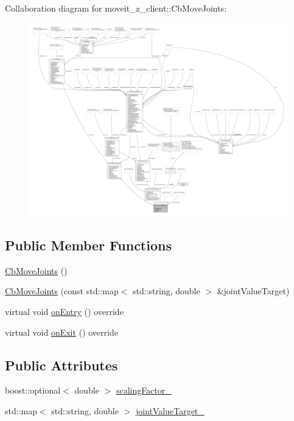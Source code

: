 Collaboration diagram for moveit\+\_\+z\+\_\+client\+:\+:Cb\+Move\+Joints\+:
\nopagebreak
\begin{figure}[H]
\begin{center}
\leavevmode
\includegraphics[width=350pt]{classmoveit__z__client_1_1CbMoveJoints__coll__graph}
\end{center}
\end{figure}
\subsection*{Public Member Functions}
\begin{DoxyCompactItemize}
\item 
\hyperlink{classmoveit__z__client_1_1CbMoveJoints_a8d9f24fd96baa202c546654f3e92f51c}{Cb\+Move\+Joints} ()
\item 
\hyperlink{classmoveit__z__client_1_1CbMoveJoints_ae0f43ac05e5263161541eb6bc15fa457}{Cb\+Move\+Joints} (const std\+::map$<$ std\+::string, double $>$ \&joint\+Value\+Target)
\item 
virtual void \hyperlink{classmoveit__z__client_1_1CbMoveJoints_a512e97e94ab05ee12837433e5d921095}{on\+Entry} () override
\item 
virtual void \hyperlink{classmoveit__z__client_1_1CbMoveJoints_a104abb9c8f8ebb04a6e5c8e84b473add}{on\+Exit} () override
\end{DoxyCompactItemize}
\subsection*{Public Attributes}
\begin{DoxyCompactItemize}
\item 
boost\+::optional$<$ double $>$ \hyperlink{classmoveit__z__client_1_1CbMoveJoints_aadb5410711e277fab3a637cb4835fb3b}{scaling\+Factor\+\_\+}
\item 
std\+::map$<$ std\+::string, double $>$ \hyperlink{classmoveit__z__client_1_1CbMoveJoints_a0f52577dd2fccf25f36c4c93e733c0f4}{joint\+Value\+Target\+\_\+}
\end{DoxyCompactItemize}
